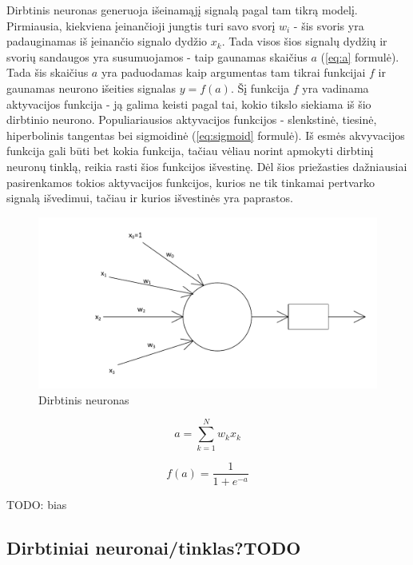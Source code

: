 \documentclass[a4paper,12pt,fleqn]{article}
\begin{document}
Dirbtinis neuronas generuoja išeinamąjį signalą pagal tam tikrą modelį.
Pirmiausia, kiekviena įeinančioji jungtis turi savo svorį $w_i$ - šis svoris yra padauginamas iš įeinančio signalo dydžio $x_k$.
Tada visos šios signalų dydžių ir svorių sandaugos yra susumuojamos - taip gaunamas skaičius $a$ (\ref{eq:a} formulė).
Tada šis skaičius $a$ yra paduodamas kaip argumentas tam tikrai funkcijai $f$ ir gaunamas neurono išeities signalas $y = f(a)$.
Šį funkcija $f$ yra vadinama aktyvacijos funkcija - ją galima keisti pagal tai, kokio tikslo siekiama iš šio dirbtinio neurono.
Populiariausios aktyvacijos funkcijos - slenkstinė, tiesinė, hiperbolinis tangentas bei sigmoidinė (\ref{eq:sigmoid} formulė).
Iš esmės akvyvacijos funkcija gali būti bet kokia funkcija, tačiau vėliau norint apmokyti dirbtinį neuronų tinklą, reikia rasti šios funkcijos išvestinę.
Dėl šios priežasties dažniausiai pasirenkamos tokios aktyvacijos funkcijos, kurios ne tik tinkamai pertvarko signalą išvedimui, tačiau ir kurios išvestinės yra paprastos.

\begin{figure}
	\includegraphics[scale=0.5]{diagrams/1_neuron}
	\caption{Dirbtinis neuronas}
	\label{fig:neuron}
\end{figure}

\begin{equation} \label{eq:a}
a = \sum_{k=1}^N w_kx_k
\end{equation}

\begin{equation} \label{eq:sigmoid}
f(a) = \frac{1}{1 + e^{-a}}
\end{equation}

TODO: bias


\subsection{Dirbtiniai neuronai/tinklas?TODO}
\end{document}
